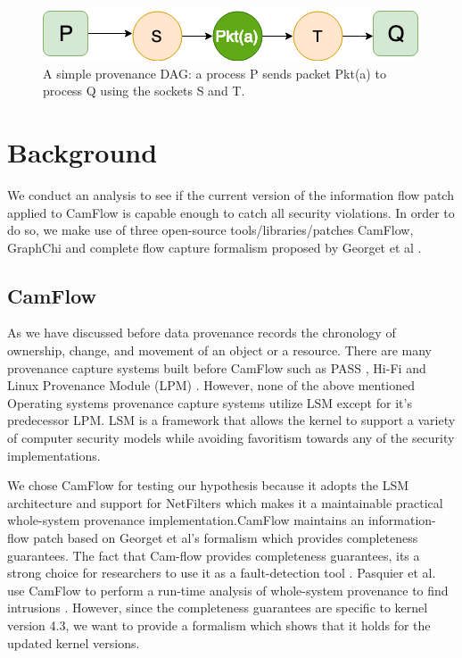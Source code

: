 \documentclass{IEEEtran}
\begin{document}
\begin{figure}
	\centering
	\includegraphics[width=0.7\linewidth]{DAG}
	\caption{A simple provenance DAG: a process P sends packet Pkt(a) to process Q using the sockets S and T.}
	\label{fig:dag}
\end{figure}

\section{Background}
We conduct an analysis to see if the current version of the information flow patch applied to CamFlow is capable enough to catch all security violations. In order to do so, we make use of three open-source tools/libraries/patches CamFlow, GraphChi and complete flow capture formalism proposed by Georget et al \cite{b3}. 

\subsection{CamFlow} 

As we have discussed before data provenance records the chronology of ownership, change, and movement of an object or a resource. There are many provenance capture systems built before CamFlow such as PASS \cite{b10}, Hi-Fi\cite{b11} and Linux Provenance Module (LPM) \cite{b12}. However, none of the above mentioned Operating systems provenance capture systems utilize LSM except for it's predecessor LPM. LSM is a framework that allows the kernel to support a variety of computer security models while avoiding favoritism towards any of the security implementations. 

We chose CamFlow for testing our hypothesis because it adopts the LSM architecture and support for NetFilters which makes it a maintainable practical whole-system provenance implementation.CamFlow maintains an information-flow patch based on Georget et al's \cite{b3}formalism which provides completeness guarantees. The fact that Cam-flow provides completeness guarantees, its a strong choice for researchers to use it as a fault-detection tool \cite{b8}. Pasquier et al. use CamFlow to perform a run-time analysis of whole-system provenance to find intrusions \cite{b6}. However, since the completeness guarantees are specific to kernel version 4.3, we want to provide a formalism which shows that it holds for the updated kernel versions.  
\end{document}
